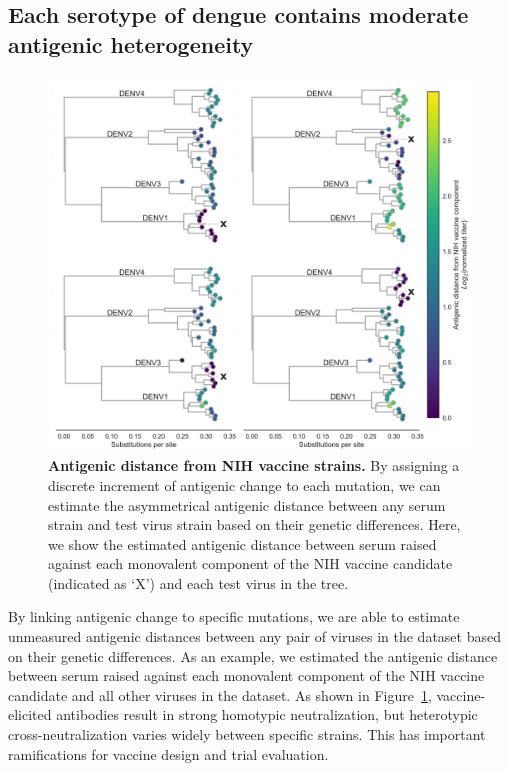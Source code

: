 \documentclass[11pt,oneside,letterpaper]{article}
\begin{document}
\subsection*{Each serotype of dengue contains moderate antigenic heterogeneity}
\begin{figure}[ht]
  \begin{centering}
    \includegraphics[width=\textwidth]{../figures/png/vaccine_titer_trees.png}
        \caption{\textbf{Antigenic distance from NIH vaccine strains.} By assigning a discrete increment of antigenic change to each mutation, we can estimate the asymmetrical antigenic distance between any serum strain and test virus strain based on their genetic differences. Here, we show the estimated antigenic distance between serum raised against each monovalent component of the NIH vaccine candidate (indicated as `X') and each test virus in the tree.}
         \label{vaccine_titer_trees}
  \end{centering}
\end{figure}

By linking antigenic change to specific mutations, we are able to estimate unmeasured antigenic distances between any pair of viruses in the dataset based on their genetic differences.
As an example, we estimated the antigenic distance between serum raised against each monovalent component of the NIH vaccine candidate and all other viruses in the dataset.
As shown in Figure~\ref{vaccine_titer_trees}, vaccine-elicited antibodies result in strong homotypic neutralization, but heterotypic cross-neutralization varies widely between specific strains.
This has important ramifications for vaccine design and trial evaluation.
\end{document}
